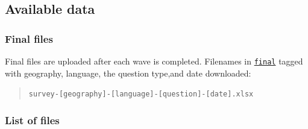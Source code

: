 \documentclass[
]{article}
\begin{document}
\hypertarget{available-data}{%
\subsection{Available data}\label{available-data}}

\hypertarget{final-files}{%
\subsubsection{Final files}\label{final-files}}

Final files are uploaded after each wave is completed. Filenames in
\href{final/}{\texttt{final}} tagged with geography, language, the
question type,and date downloaded:

\begin{quote}
\texttt{survey-{[}geography{]}-{[}language{]}-{[}question{]}-{[}date{]}.xlsx}
\end{quote}

\hypertarget{list-of-files}{%
\subsubsection{List of files}\label{list-of-files}}
\end{document}
